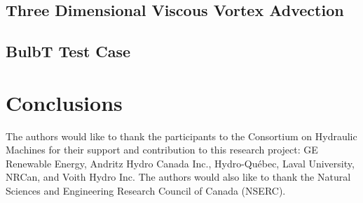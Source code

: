 \documentclass[twocolumn,10pt]{asme2ej}
\begin{document}
\subsection{Three Dimensional Viscous Vortex Advection}



\subsection{BulbT Test Case}


\section{Conclusions}


\begin{acknowledgment}
The authors would like to thank the participants to the Consortium on Hydraulic Machines for their support and contribution to this research project: GE Renewable Energy, Andritz Hydro Canada Inc., Hydro-Qu\'ebec, Laval University, NRCan, and Voith Hydro Inc. The authors would also like to thank the Natural Sciences and Engineering Research Council of Canada (NSERC).
\end{acknowledgment}
\FloatBarrier
%




%
\end{document}
